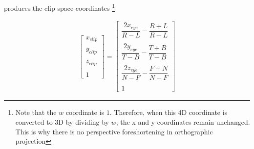 \documentclass{article}
\begin{document}
    \noindent produces the clip space coordinates \footnote{Note that the $w$ coordinate is $1$. Therefore, when this 4D coordinate is converted to 3D by dividing by $w$, the x and y coordinates remain unchanged. This is why there is no perspective foreshortening in orthographic projection}


    \begin{align}
        \begin{bmatrix} x_{clip} \\ \\ y_{clip} \\ \\ z_{clip} \\ \\ 1 \end{bmatrix} = 
        \begin{bmatrix} \dfrac{2x_{eye}}{R-L} - \dfrac{R+L}{R-L} \\ \\ \dfrac{2y_{eye}}{T-B} - \dfrac{T+B}{T-B} \\ \\ \dfrac{2z_{eye}}{N-F} - \dfrac{F+N}{N-F} \\ \\ 1 \end{bmatrix}
    \end{align}

    

    \noindent 
    
\end{document}
